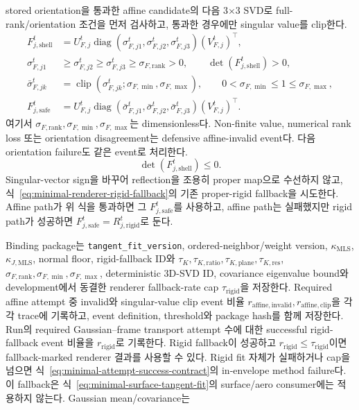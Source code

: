 \documentclass[11pt]{article}
\begin{document}
stored orientation을 통과한 affine candidate의 다음 3\(\times\)3 SVD로 full-rank/orientation 조건을
먼저 검사하고, 통과한 경우에만 singular value를 clip한다.
\begin{equation}
\begin{aligned}
  F_{j,\mathrm{shell}}^t
  &=U_{F,j}^t
    \operatorname{diag}(\sigma_{F,j1}^t,\sigma_{F,j2}^t,\sigma_{F,j3}^t)
    (V_{F,j}^t)^\top,\\
  \sigma_{F,j1}^t&\geq\sigma_{F,j2}^t\geq\sigma_{F,j3}^t
    \geq\sigma_{F,\mathrm{rank}}>0,
  \qquad \det(F_{j,\mathrm{shell}}^t)>0,\\
  \bar\sigma_{F,jk}^t
  &=\operatorname{clip}(\sigma_{F,jk}^t;\sigma_{F,\min},\sigma_{F,\max}),
  \qquad 0<\sigma_{F,\min}\leq1\leq\sigma_{F,\max},\\
  F_{j,\mathrm{safe}}^t
  &=U_{F,j}^t
    \operatorname{diag}(\bar\sigma_{F,j1}^t,
                        \bar\sigma_{F,j2}^t,
                        \bar\sigma_{F,j3}^t)
    (V_{F,j}^t)^\top .
\end{aligned}
  \label{eq:minimal-affine-safe-map}
\end{equation}
여기서 \(\sigma_{F,\mathrm{rank}},\sigma_{F,\min},\sigma_{F,\max}\)는 dimensionless다.
Non-finite value, numerical rank loss 또는 orientation disagreement는
defensive affine-invalid event다. 다음 orientation failure도 같은 event로 처리한다.
\[
  \det(F_{j,\mathrm{shell}}^t)\leq0.
\]
Singular-vector sign을 바꾸어
reflection을 조용히 proper map으로 수선하지 않고, 식~\eqref{eq:minimal-renderer-rigid-fallback}의 기존
proper-rigid fallback을 시도한다. Affine path가 위 식을 통과하면 그 \(F_{j,\mathrm{safe}}^t\)를 사용하고,
affine path는 실패했지만 rigid path가 성공하면
\(F_{j,\mathrm{safe}}^t=R_{j,\mathrm{rigid}}^t\)로 둔다.

Binding package는 \texttt{tangent\_fit\_version}, ordered-neighbor/weight version,
\(\kappa_{\mathrm{MLS}}\), \(\kappa_{J,\mathrm{MLS}}\),
normal floor, rigid-fallback ID와
\(\tau_K,\tau_{K,\mathrm{ratio}},\tau_{K,\mathrm{plane}},\tau_{K,\mathrm{res}}\),
\(\sigma_{F,\mathrm{rank}},\sigma_{F,\min},\sigma_{F,\max}\), deterministic 3D-SVD ID,
covariance eigenvalue bound와
development에서 동결한 renderer fallback-rate cap \(\tau_{\mathrm{rigid}}\)을 저장한다.
Required affine attempt 중 invalid와 singular-value clip event 비율
\(r_{\mathrm{affine,invalid}},r_{\mathrm{affine,clip}}\)을 각각 trace에 기록하고,
event definition, threshold와 package hash를 함께 저장한다.
Run의 required Gaussian--frame transport attempt 수에 대한 successful rigid-fallback event 비율을
\(r_{\mathrm{rigid}}\)로 기록한다. Rigid fallback이 성공하고
\(r_{\mathrm{rigid}}\leq\tau_{\mathrm{rigid}}\)이면 fallback-marked renderer 결과를 사용할 수 있다.
Rigid fit 자체가 실패하거나 cap을 넘으면 식~\eqref{eq:minimal-attempt-success-contract}의
in-envelope method failure다. 이 fallback은 식~\eqref{eq:minimal-surface-tangent-fit}의
surface/aero consumer에는 적용하지 않는다. Gaussian mean/covariance는
\end{document}
